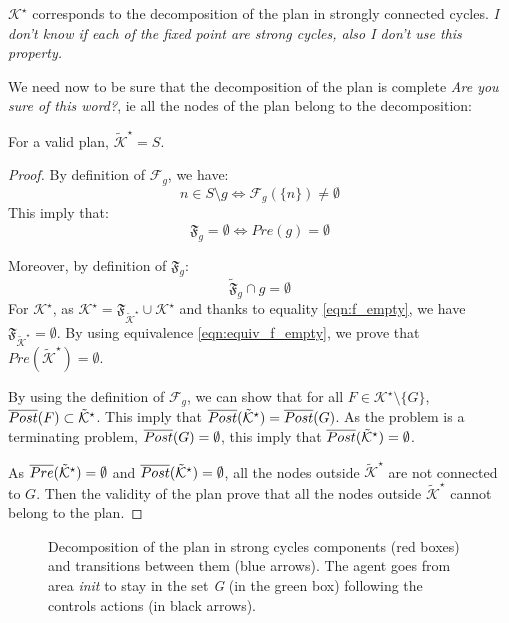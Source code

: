 $\mathcal{K}^\star$ corresponds to the decomposition of the plan in strongly connected cycles.
\textit{I don't know if each of the fixed point are strong cycles, also I don't use this property.}

We need now to be sure that the decomposition of the plan is complete \textit{Are you sure of this word?}, ie all the nodes of the plan belong to the decomposition:
\begin{prop}
For a valid plan, $\tilde{\mathcal{K}}^\star = S$.
\end{prop}
\begin{proof}

By definition of $\mathcal{F}_g$, we have:
\begin{equation}
n \in S \setminus g \Leftrightarrow \mathcal{F}_g(\{n\}) \neq \emptyset
\end{equation}
This imply that:
\begin{equation} \label{eqn:equiv_f_empty}
\mathfrak{F}_g = \emptyset \Leftrightarrow Pre(g) = \emptyset
\end{equation}

Moreover, by definition of $\mathfrak{F}_g$:
\begin{equation} \label{eqn:f_empty}
\tilde{\mathfrak{F}}_g \cap g = \emptyset
\end{equation}
For $\mathcal{K}^\star$, as $\mathcal{K}^\star = \mathfrak{F}_{\tilde{\mathcal{K}}^\star} \cup \mathcal{K}^\star$ and thanks to equality \ref{eqn:f_empty}, we have $\mathfrak{F}_{\tilde{\mathcal{K}}^\star} = \emptyset$.  
By using equivalence \ref{eqn:equiv_f_empty}, we prove that $Pre(\tilde{\mathcal{K}}^\star) = \emptyset$.

By using the definition of $\mathcal{F}_g$,
we can show that for all $F \in \mathcal{K}^\star \setminus \{G\}$, $\overline{Post} (F) \subset \tilde{\mathcal{K}}^\star$.
This imply that $\overline{Post} (\tilde{\mathcal{K}}^\star) = \overline{Post} (G)$.
As the problem is a terminating problem, $\overline{Post} (G) = \emptyset$, this imply that 
$\overline{Post} (\tilde{\mathcal{K}}^\star)  = \emptyset$.

As $\overline{Pre} (\tilde{\mathcal{K}}^\star)  = \emptyset$ and $\overline{Post} (\tilde{\mathcal{K}}^\star)  = \emptyset$, all the nodes outside $\tilde{\mathcal{K}}^\star$ are not connected to $G$.
Then the validity of the plan prove that all the nodes outside   $\tilde{\mathcal{K}}^\star$ cannot belong to the plan.
\end{proof}


\begin{figure}
	\center
	
	\caption{Decomposition of the plan in strong cycles components (red boxes) and transitions between them (blue arrows). The agent goes from area \textit{init} to stay in the set \textit{G} (in the green box) following the controls actions (in black arrows).}
	\label{fig:environment}
\end{figure}

